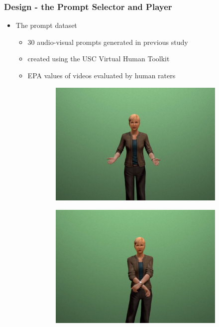 \documentclass{beamer}
\begin{document}
\begin{frame}
\frametitle{Design - the Prompt Selector and Player}
\begin{itemize}
\item The prompt dataset 
\begin{itemize}
\item 30 audio-visual prompts generated in previous study
\item created using the USC Virtual Human Toolkit
\item EPA values of videos evaluated by human raters
\end{itemize}
\begin{figure}[htb]
\centering
\begin{subfigure}[b]{.4\textwidth}
\includegraphics[width=\textwidth]{fig/prompt1.jpg}
\end{subfigure}
\begin{subfigure}[b]{.4\textwidth}
\includegraphics[width=\textwidth]{fig/prompt2.jpg}

\end{subfigure}
\end{figure}
\end{itemize}
\end{frame}
\end{document}
